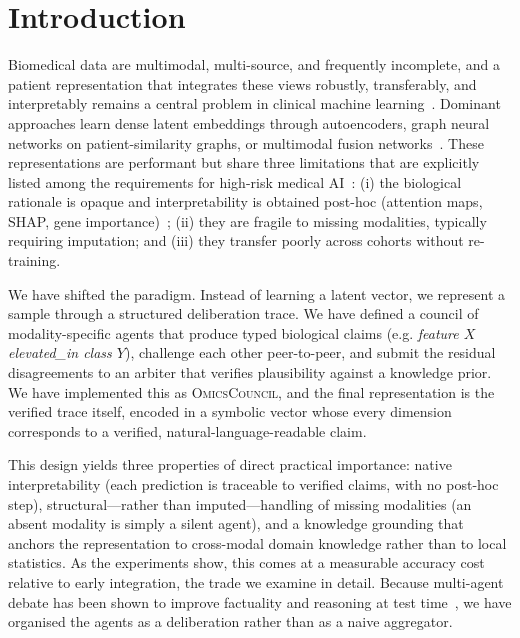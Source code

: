 \documentclass[runningheads]{llncs}
\begin{document}
\section{Introduction}
Biomedical data are multimodal, multi-source, and frequently incomplete, and a patient representation that integrates these views robustly, transferably, and interpretably remains a central problem in clinical machine learning~\cite{reel2021mlomics}. Dominant approaches learn dense latent embeddings through autoencoders, graph neural networks on patient-similarity graphs, or multimodal fusion networks~\cite{benkirane2023customics,wang2021mogonet,wang2014snf}. These representations are performant but share three limitations that are explicitly listed among the requirements for high-risk medical AI~\cite{euaiact2024}: (i) the biological rationale is opaque and interpretability is obtained post-hoc (attention maps, SHAP, gene importance)~\cite{lundberg2017shap}; (ii) they are fragile to missing modalities, typically requiring imputation; and (iii) they transfer poorly across cohorts without re-training.

We have shifted the paradigm. Instead of learning a latent vector, we represent a sample through a structured deliberation trace. We have defined a council of modality-specific agents that produce typed biological claims (e.g. \textit{feature $X$ elevated\_in class $Y$}), challenge each other peer-to-peer, and submit the residual disagreements to an arbiter that verifies plausibility against a knowledge prior. We have implemented this as \textsc{OmicsCouncil}, and the final representation is the verified trace itself, encoded in a symbolic vector whose every dimension corresponds to a verified, natural-language-readable claim.

This design yields three properties of direct practical importance: native interpretability (each prediction is traceable to verified claims, with no post-hoc step), structural---rather than imputed---handling of missing modalities (an absent modality is simply a silent agent), and a knowledge grounding that anchors the representation to cross-modal domain knowledge rather than to local statistics. As the experiments show, this comes at a measurable accuracy cost relative to early integration, the trade we examine in detail. Because multi-agent debate has been shown to improve factuality and reasoning at test time~\cite{du2024debate,liang2024divergent}, we have organised the agents as a deliberation rather than as a naive aggregator.
\end{document}
